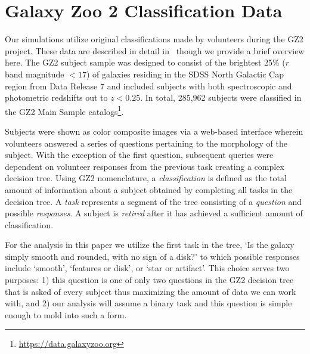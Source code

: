\documentclass[twocolumn]{aastex6}
\begin{document}
\section{Galaxy Zoo 2 Classification Data} \label{sec: data}

Our simulations utilize original classifications made by volunteers during the GZ2 project. 
These data are described in detail in~\cite{Willett2013} though we provide a brief overview here.  
The GZ2 subject sample was designed to consist of the brightest 25\% ($r$ band magnitude $< 17$) 
of galaxies residing in the SDSS North Galactic Cap region from Data Release 7 
and included subjects with both spectroscopic and photometric redshifts out to $z < 0.25$.
In total, 285,962 subjects were classified in the GZ2 Main Sample 
catalogs\footnote{\url{https://data.galaxyzoo.org}}. 

Subjects were shown as color composite images via a web-based interface wherein 
volunteers answered a series of questions pertaining to the morphology of the subject.
With the exception of the first question, subsequent queries were 
dependent on volunteer responses from the previous task creating a complex decision tree. 
Using GZ2 nomenclature,  a \textit{classification} is defined as the total amount of
information about a subject obtained by completing all tasks in the decision tree. 
A \textit{task} represents a segment of the
tree consisting of a \textit{question} and possible \textit{responses}. 
A subject is \textit{retired} after it has achieved a sufficient amount of classification.


For the analysis in this paper we utilize the first task in the tree, 
`Is the galaxy simply smooth and rounded, with no sign of a disk?' to which possible 
responses include `smooth', `features or disk', or `star or artifact'. This choice
serves two purposes: 1) this question is one of only two questions in the GZ2
decision tree that is asked of every subject thus maximizing the amount of data
we can work with, and 2) our analysis will assume a 
binary task and this question is simple enough to mold into such a form. 
\end{document}
